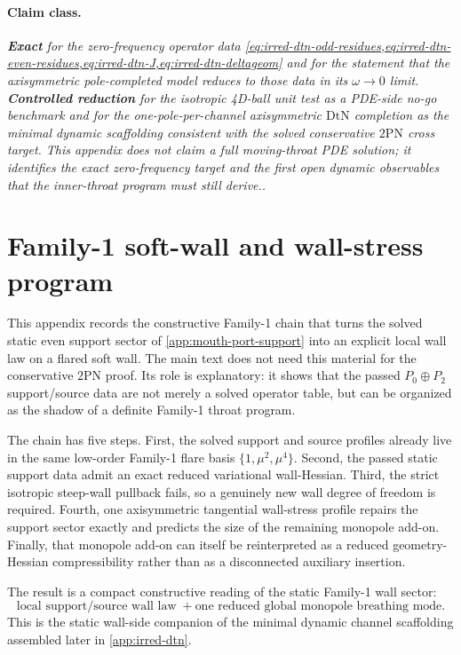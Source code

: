 \documentclass[11pt]{article}
\newcommand{\TwoPN}{\mathrm{2PN}}
\newcommand{\DtN}{\mathrm{DtN}}
\newcommand{\Exact}{\textbf{Exact}}
\newcommand{\Controlled}{\textbf{Controlled reduction}}
\newcommand{\claimclass}[1]{\paragraph{Claim class.}\emph{#1.}}
\begin{document}
\claimclass{\Exact{} for the zero-frequency operator data
\cref{eq:irred-dtn-odd-residues,eq:irred-dtn-even-residues,eq:irred-dtn-J,eq:irred-dtn-deltageom}
and for the statement that the axisymmetric pole-completed model reduces to those data in
its \(\omega\to 0\) limit.  \Controlled{} for the isotropic 4D-ball unit test as a
PDE-side no-go benchmark and for the one-pole-per-channel axisymmetric
\(\DtN\) completion as the minimal dynamic scaffolding consistent with the solved
conservative \(\TwoPN\) cross target.  This appendix does not claim a full moving-throat
PDE solution; it identifies the exact zero-frequency target and the first open dynamic
observables that the inner-throat program must still derive.}

\section{Family-1 soft-wall and wall-stress program}
\label{app:family1}

This appendix records the constructive Family-1 chain that turns the solved static even
support sector of \cref{app:mouth-port-support} into an explicit local wall law on a
flared soft wall.  The main text does not need this material for the conservative
\(\TwoPN\) proof.  Its role is explanatory: it shows that the passed
\(P_0\oplus P_2\) support/source data are not merely a solved operator table, but can be
organized as the shadow of a definite Family-1 throat program.

The chain has five steps.
First, the solved support and source profiles already live in the same low-order
Family-1 flare basis \(\{1,\mu^2,\mu^4\}\).
Second, the passed static support data admit an exact reduced variational wall-Hessian.
Third, the strict isotropic steep-wall pullback fails, so a genuinely new wall degree of
freedom is required.
Fourth, one axisymmetric tangential wall-stress profile repairs the support sector
exactly and predicts the size of the remaining monopole add-on.
Finally, that monopole add-on can itself be reinterpreted as a reduced geometry-Hessian
compressibility rather than as a disconnected auxiliary insertion.

The result is a compact constructive reading of the static Family-1 wall sector:
\begin{equation}
\boxed{
\text{local support/source wall law}
\;+
\text{one reduced global monopole breathing mode}.
}
\label{eq:family1-static-summary}
\end{equation}
This is the static wall-side companion of the minimal dynamic channel scaffolding
assembled later in \cref{app:irred-dtn}.
\end{document}
